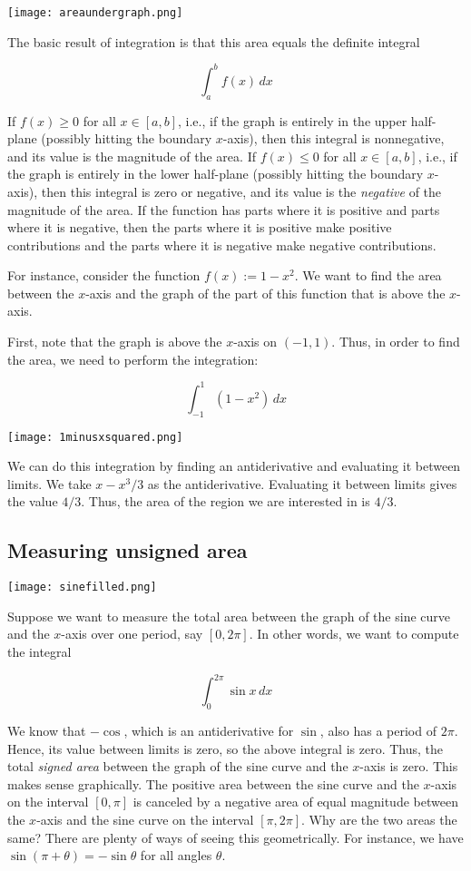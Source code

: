 \documentclass[10pt]{amsart}
\begin{document}
\texttt{[image: areaundergraph.png]}

The basic result of integration is that this area equals the definite
integral

$$\int_a^b f(x) \, dx$$

If $f(x) \ge 0$ for all $x \in [a,b]$, i.e., if the graph is entirely
in the upper half-plane (possibly hitting the boundary $x$-axis), then
this integral is nonnegative, and its value is the magnitude of the
area. If $f(x) \le 0$ for all $x \in [a,b]$, i.e., if the graph is
entirely in the lower half-plane (possibly hitting the boundary
$x$-axis), then this integral is zero or negative, and its value is
the {\em negative} of the magnitude of the area. If the function has
parts where it is positive and parts where it is negative, then the
parts where it is positive make positive contributions and the parts
where it is negative make negative contributions.

For instance, consider the function $f(x) := 1 - x^2$. We want to find
the area between the $x$-axis and the graph of the part of this
function that is above the $x$-axis.

First, note that the graph is above the $x$-axis on $(-1,1)$. Thus, in
order to find the area, we need to perform the integration:

$$\int_{-1}^1 (1 - x^2) \, dx$$

\texttt{[image: 1minusxsquared.png]}

We can do this integration by finding an antiderivative and evaluating
it between limits. We take $x - x^3/3$ as the
antiderivative. Evaluating it between limits gives the value
$4/3$. Thus, the area of the region we are interested in is $4/3$.

\subsection{Measuring unsigned area}

\texttt{[image: sinefilled.png]}

Suppose we want to measure the total area between the graph of the
sine curve and the $x$-axis over one period, say $[0,2\pi]$. In other
words, we want to compute the integral

$$\int_0^{2\pi} \sin x \, dx$$

We know that $- \cos$, which is an antiderivative for $\sin$, also has
a period of $2\pi$. Hence, its value between limits is zero, so the
above integral is zero. Thus, the total {\em signed area} between the
graph of the sine curve and the $x$-axis is zero. This makes sense
graphically. The positive area between the sine curve and the $x$-axis
on the interval $[0,\pi]$ is canceled by a negative area of equal
magnitude between the $x$-axis and the sine curve on the interval
$[\pi,2\pi]$. Why are the two areas the same? There are plenty of ways
of seeing this geometrically. For instance, we have $\sin(\pi +
\theta) = -\sin \theta$ for all angles $\theta$.
\end{document}
